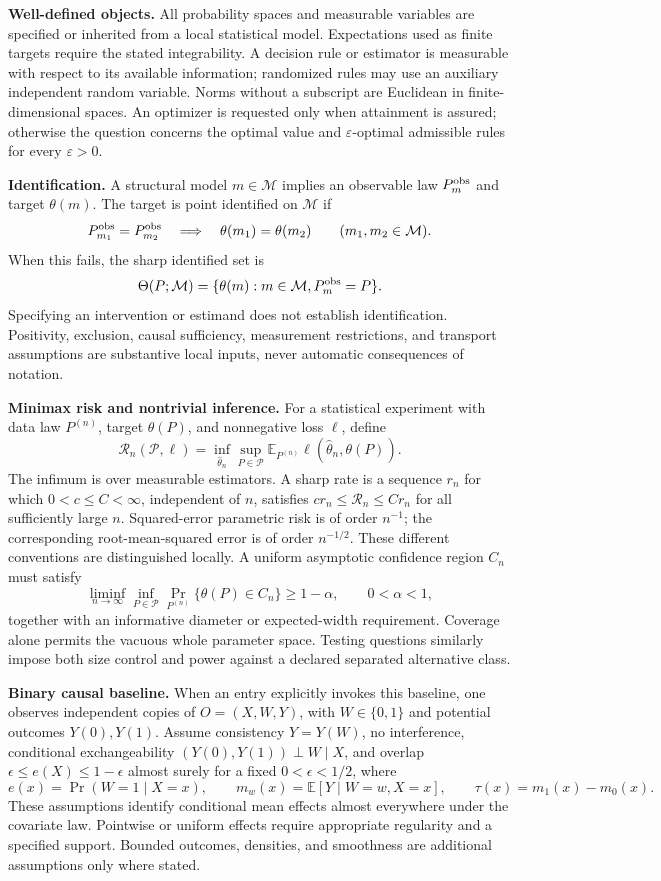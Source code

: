 \documentclass[11pt,a4paper]{article}
\newcommand{\E}{\mathbb E}
\begin{document}
\textbf{Well-defined objects.}
All probability spaces and measurable variables are specified or inherited
from a local statistical model. Expectations used as finite targets require
the stated integrability. A decision rule or estimator is measurable with
respect to its available information; randomized rules may use an auxiliary
independent random variable. Norms without a subscript are Euclidean in
finite-dimensional spaces. An optimizer is requested only when attainment
is assured; otherwise the question concerns the optimal value and
$\varepsilon$-optimal admissible rules for every $\varepsilon>0$.

\textbf{Identification.}
A structural model $m\in\mathcal M$ implies an observable law
$P_m^{\rm obs}$ and target $\theta(m)$. The target is point identified on
$\mathcal M$ if
\[
 P_{m_1}^{\rm obs}=P_{m_2}^{\rm obs}
 \quad\Longrightarrow\quad\theta(m_1)=\theta(m_2)
 \qquad(m_1,m_2\in\mathcal M).
\]
When this fails, the sharp identified set is
\[
 \Theta(P;\mathcal M)=\{\theta(m):m\in\mathcal M,
                                  P_m^{\rm obs}=P\}.
\]
Specifying an intervention or estimand does not establish identification.
Positivity, exclusion, causal sufficiency, measurement restrictions, and
transport assumptions are substantive local inputs, never automatic
consequences of notation.

\textbf{Minimax risk and nontrivial inference.}
For a statistical experiment with data law $P^{(n)}$, target $\theta(P)$,
and nonnegative loss $\ell$, define
\[
 \mathcal R_n(\mathcal P,\ell)
   =\inf_{\widehat\theta_n}\sup_{P\in\mathcal P}
      \E_{P^{(n)}}\ell(\widehat\theta_n,\theta(P)).
\]
The infimum is over measurable estimators. A sharp rate is a sequence
$r_n$ for which $0<c\leq C<\infty$, independent of $n$, satisfies
$c r_n\leq\mathcal R_n\leq C r_n$ for all sufficiently large $n$.
Squared-error parametric risk is of order $n^{-1}$; the corresponding
root-mean-squared error is of order $n^{-1/2}$. These different conventions
are distinguished locally. A uniform asymptotic confidence region $C_n$
must satisfy
\[
 \liminf_{n\to\infty}\inf_{P\in\mathcal P}
     \Pr_{P^{(n)}}\{\theta(P)\in C_n\}\geq 1-\alpha,
 \qquad 0<\alpha<1,
\]
together with an informative diameter or expected-width requirement.
Coverage alone permits the vacuous whole parameter space. Testing questions
similarly impose both size control and power against a declared separated
alternative class.

\textbf{Binary causal baseline.}
When an entry explicitly invokes this baseline, one observes independent
copies of $O=(X,W,Y)$, with $W\in\{0,1\}$ and potential outcomes $Y(0),Y(1)$.
Assume consistency $Y=Y(W)$, no interference, conditional exchangeability
$(Y(0),Y(1))\perp W\mid X$, and overlap
$\epsilon\leq e(X)\leq1-\epsilon$ almost surely for a fixed
$0<\epsilon<1/2$, where
\[
 e(x)=\Pr(W=1\mid X=x),\qquad
 m_w(x)=\E[Y\mid W=w,X=x],\qquad
 \tau(x)=m_1(x)-m_0(x).
\]
These assumptions identify conditional mean effects almost everywhere
under the covariate law. Pointwise or uniform effects require appropriate
regularity and a specified support. Bounded outcomes, densities, and
smoothness are additional assumptions only where stated.
\end{document}

